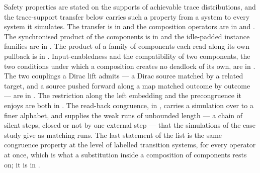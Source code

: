 Safety properties are stated on the supports of achievable trace distributions, and the trace-support transfer below carries such a property from a system to every system it simulates.
The transfer is in  and the composition operators are in  and .
The synchronised product of the components is in  and the idle-padded instance families are in .
The product of a family of components each read along its own pullback is in .
Input-enabledness and the compatibility of two components, the two conditions under which a composition creates no deadlock of its own, are in .
The two couplings a Dirac lift admits --- a Dirac source matched by a related target, and a source pushed forward along a map matched outcome by outcome --- are in .
The restriction along the left embedding and the precongruence it enjoys are both in .
The read-back congruence, in , carries a simulation over to a finer alphabet, and  supplies the weak runs of unbounded length --- a chain of silent steps, closed or not by one external step --- that the simulations of the case study give as matching runs.
The last statement of the list is the same congruence property at the level of labelled transition systems, for every operator at once, which is what a substitution inside a composition of components rests on; it is in .
















